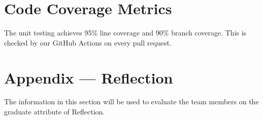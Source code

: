 \documentclass[12pt, titlepage]{article}
\begin{document}
\section{Code Coverage Metrics}

The unit testing achieves 95\% line coverage and 90\% branch
coverage. This is checked by our GitHub Actions on every pull request.




\newpage{}
\section*{Appendix --- Reflection}

The information in this section will be used to evaluate the team members on the
graduate attribute of Reflection.


\end{document}
